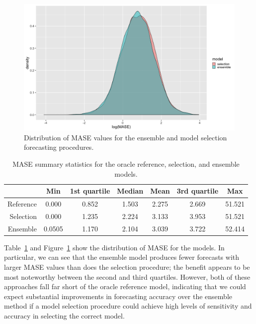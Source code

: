 \documentclass[11pt,3p,review,authoryear]{elsarticle}
\begin{document}
\begin{figure}[h]
\centering
\includegraphics[width=\textwidth]{distribution}
\caption{Distribution of MASE values for the ensemble and model selection forecasting procedures.}\label{fig:a}
\end{figure}

\begin{table}[ht]
\centering
\caption{MASE summary statistics for the oracle reference, selection, and ensemble models.}\label{tab:a}
\begin{tabular}{rcccccc}
\hline
& Min & 1st quartile & Median & Mean & 3rd quartile & Max\\
\hline
Reference \vline & 0.000 & 0.852 & 1.503 & 2.275 & 2.669 & 51.521\\
Selection \vline & 0.000 & 1.235 & 2.224 & 3.133 & 3.953 & 51.521 \\
Ensemble \vline & 0.0505 & 1.170 & 2.104 & 3.039 & 3.722 & 52.414\\
\hline
\end{tabular}
\end{table}


Table~\ref{tab:a} and Figure~\ref{fig:a} show the distribution of MASE for the models. In particular, we can see that the ensemble model produces fewer forecasts with larger MASE values than does the selection procedure; the benefit appears to be most noteworthy between the second and third quartiles. However, both of these approaches fall far short of the oracle reference model, indicating that we could expect substantial improvements in forecasting accuracy over the ensemble method if a model selection procedure could achieve high levels of sensitivity and accuracy in selecting the correct model.
\end{document}
